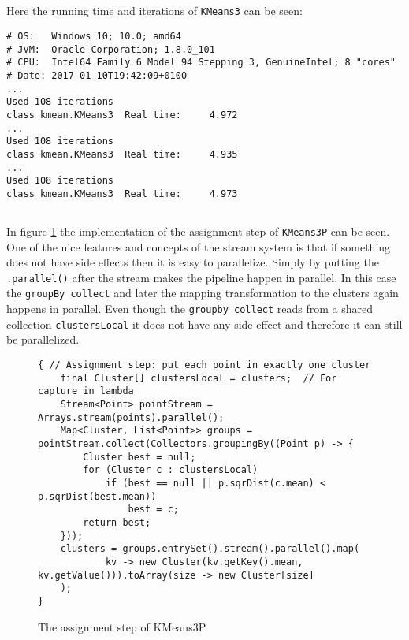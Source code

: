 \subsection{}
Here the running time and iterations of \texttt{KMeans3} can be seen:
\begin{lstlisting}
# OS:   Windows 10; 10.0; amd64
# JVM:  Oracle Corporation; 1.8.0_101
# CPU:  Intel64 Family 6 Model 94 Stepping 3, GenuineIntel; 8 "cores"
# Date: 2017-01-10T19:42:09+0100
...
Used 108 iterations
class kmean.KMeans3  Real time:     4.972
...
Used 108 iterations
class kmean.KMeans3  Real time:     4.935
...
Used 108 iterations
class kmean.KMeans3  Real time:     4.973
\end{lstlisting}

\subsection{}
In figure \ref{code:4:4} the implementation of the assignment step of \texttt{KMeans3P} can be seen. One of the nice features and concepts of the stream system is that if something does not have side effects then it is easy to parallelize. Simply by putting the \texttt{.parallel()} after the stream makes the pipeline happen in parallel. In this case the \texttt{groupBy collect} and later the mapping transformation to the clusters again happens in parallel. Even though the \texttt{groupby collect} reads from a shared collection \texttt{clustersLocal} it does not have any side effect and therefore it can still be parallelized.

\begin{figure}
\begin{lstlisting}
{ // Assignment step: put each point in exactly one cluster
    final Cluster[] clustersLocal = clusters;  // For capture in lambda
    Stream<Point> pointStream = Arrays.stream(points).parallel();
    Map<Cluster, List<Point>> groups = pointStream.collect(Collectors.groupingBy((Point p) -> {
        Cluster best = null;
        for (Cluster c : clustersLocal)
            if (best == null || p.sqrDist(c.mean) < p.sqrDist(best.mean))
                best = c;
        return best;
    }));
    clusters = groups.entrySet().stream().parallel().map(
            kv -> new Cluster(kv.getKey().mean, kv.getValue())).toArray(size -> new Cluster[size]
    );
}
\end{lstlisting}
\caption{The assignment step of KMeans3P}
\label{code:4:4}
\end{figure}

